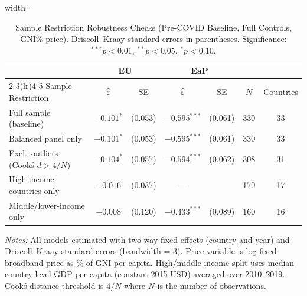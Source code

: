 \begin{table}[htbp]
\centering
\caption{Sample Restriction Robustness Checks (Pre-COVID Baseline, Full Controls,
    GNI\%-price). Driscoll--Kraay standard errors in parentheses.
    Significance: $^{***}p<0.01$, $^{**}p<0.05$, $^{*}p<0.10$.}
\label{tab:sample_restrictions}
\begin{minipage}{\textwidth}
\begin{adjustbox}{width=\textwidth}
\scriptsize
\begin{tabular}{lcccccc}
\toprule
& \multicolumn{2}{c}{EU} & \multicolumn{2}{c}{EaP} & & \\
\cmidrule(lr){2-3}\cmidrule(lr){4-5}
Sample Restriction & $\hat\varepsilon$ & SE & $\hat\varepsilon$ & SE & $N$ & Countries \\
\midrule
Full sample (baseline) & $-0.101^{*}$ & (0.053) & $-0.595^{***}$ & (0.061) & 330 & 33 \\
\addlinespace[4pt]
Balanced panel only & $-0.101^{*}$ & (0.053) & $-0.595^{***}$ & (0.061) & 330 & 33 \\
\addlinespace[4pt]
Excl.\ outliers (Cook\'s $d>4/N$) & $-0.104^{*}$ & (0.057) & $-0.594^{***}$ & (0.062) & 308 & 31 \\
\addlinespace[4pt]
High-income countries only & $-0.016$ & (0.037) & \multicolumn{1}{c}{---} & \multicolumn{1}{c}{} & 170 & 17 \\
\addlinespace[4pt]
Middle/lower-income only & $-0.008$ & (0.120) & $-0.433^{***}$ & (0.089) & 160 & 16 \\
\bottomrule
\end{tabular}
\end{adjustbox}
\begin{tablenotes}
\scriptsize
\item \textit{Notes:} All models estimated with two-way fixed effects (country and year)
    and Driscoll--Kraay standard errors (bandwidth = 3). Price variable is log fixed
    broadband price as \% of GNI per capita. High/middle-income split uses median
    country-level GDP per capita (constant 2015 USD) averaged over 2010--2019.
    Cook\'s distance threshold is $4/N$ where $N$ is the number of observations.
\end{tablenotes}
\end{minipage}
\end{table}
